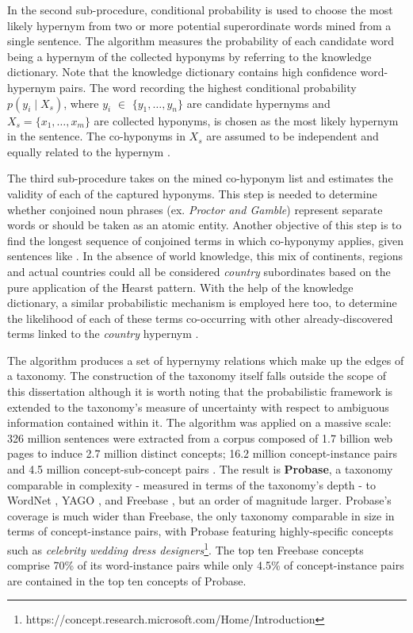 In the second sub-procedure, conditional probability is used to choose the most likely hypernym from two or more potential superordinate words mined from a single sentence.  The algorithm measures the probability of each candidate word being a hypernym of the collected hyponyms by referring to the knowledge dictionary.  Note that the knowledge dictionary contains high confidence word-hypernym pairs.  The word recording the highest conditional probability $p(y_i \mid X_s)$, where $y_i$ $\in$ $\{y_1,\ldots,y_n\}$ are candidate hypernyms and $X_s=\{x_1,\ldots, x_m\}$ are collected hyponyms, is chosen as the most likely hypernym in the sentence.  The co-hyponyms in \(X_s\) are assumed to be independent and equally related to the hypernym \citep{wu2012probase}.

The third sub-procedure takes on the mined co-hyponym list and estimates the validity of each of the captured hyponyms.  This step is needed to determine whether conjoined noun phrases (ex. \textit{Proctor and Gamble}) represent separate words or should be taken as an atomic entity.  Another objective of this step is to find the longest sequence of conjoined terms in which co-hyponymy applies, given sentences like .  In the absence of world knowledge, this mix of continents, regions and actual countries could all be considered \textit{country} subordinates based on the pure application of the Hearst pattern.  With the help of the knowledge dictionary, a similar probabilistic mechanism is employed here too, to determine the likelihood of each of these terms co-occurring with other already-discovered terms linked to the \textit{country} hypernym \citep{wu2012probase}.  

The algorithm produces a set of hypernymy relations which make up the edges of a taxonomy.  The construction of the taxonomy itself falls outside the scope of this dissertation although it is worth noting that the probabilistic framework is extended to the taxonomy’s measure of uncertainty with respect to ambiguous information contained within it.  The algorithm was applied on a massive scale:  326 million sentences were extracted from a corpus composed of 1.7 billion web pages to induce 2.7 million distinct concepts; 16.2 million concept-instance pairs and 4.5 million concept-sub-concept pairs \citep{wu2012probase}.  The result is \textbf{Probase}, a taxonomy comparable in complexity  - measured in terms of the taxonomy’s depth - to WordNet \citep{Miller1995}, YAGO \citep{suchanek2007yago}, and Freebase \citep{bollacker2008freebase}, but an order of magnitude larger.  Probase’s coverage is much wider than Freebase, the only taxonomy comparable in size in terms of concept-instance pairs, with Probase featuring highly-specific concepts such as \textit{celebrity wedding dress designers}\footnote{https://concept.research.microsoft.com/Home/Introduction}.  The top ten Freebase concepts comprise 70\% of its word-instance pairs while only 4.5\% of concept-instance pairs are contained in the top ten concepts of Probase.


